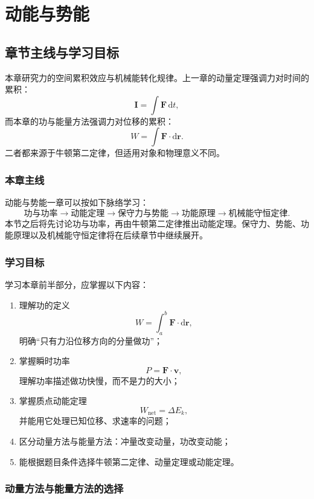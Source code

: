 \chapter{动能与势能}

\section{章节主线与学习目标}

本章研究力的空间累积效应与机械能转化规律。上一章的动量定理强调力对时间的累积：
\[
    \boldsymbol I=\int \boldsymbol F\,\mathrm dt,
\]
而本章的功与能量方法强调力对位移的累积：
\[
    W=\int \boldsymbol F\cdot\mathrm d\boldsymbol r .
\]
二者都来源于牛顿第二定律，但适用对象和物理意义不同。

\subsection{本章主线}

动能与势能一章可以按如下脉络学习：
\[
    \text{功与功率}
    \longrightarrow
    \text{动能定理}
    \longrightarrow
    \text{保守力与势能}
    \longrightarrow
    \text{功能原理}
    \longrightarrow
    \text{机械能守恒定律}.
\]
本节之后将先讨论功与功率，再由牛顿第二定律推出动能定理。保守力、势能、功能原理以及机械能守恒定律将在后续章节中继续展开。

\subsection{学习目标}

学习本章前半部分，应掌握以下内容：

\begin{enumerate}
    \item 理解功的定义
    \[
        W=\int_a^b\boldsymbol F\cdot\mathrm d\boldsymbol r,
    \]
    明确“只有力沿位移方向的分量做功”；
    \item 掌握瞬时功率
    \[
        P=\boldsymbol F\cdot\boldsymbol v,
    \]
    理解功率描述做功快慢，而不是力的大小；
    \item 掌握质点动能定理
    \[
        W_{\mathrm{net}}=\Delta E_k,
    \]
    并能用它处理已知位移、求速率的问题；
    \item 区分动量方法与能量方法：冲量改变动量，功改变动能；
    \item 能根据题目条件选择牛顿第二定律、动量定理或动能定理。
\end{enumerate}

\subsection{动量方法与能量方法的选择}

